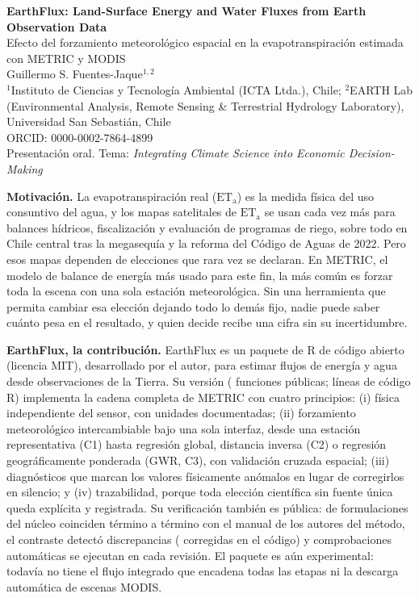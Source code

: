 \documentclass[10pt,a4paper]{article}
\newcommand{\ETa}{\mathrm{ET_a}}
\begin{document}
\begin{center}
{\Large\bfseries EarthFlux: Land-Surface Energy and Water Fluxes from Earth Observation Data}\\[3pt]
{\large Efecto del forzamiento meteorológico espacial en la evapotranspiración estimada con METRIC y MODIS}\\[6pt]
Guillermo S. Fuentes-Jaque$^{1,2}$\\
{\small $^{1}$Instituto de Ciencias y Tecnología Ambiental (ICTA Ltda.), Chile; $^{2}$EARTH Lab (Environmental Analysis, Remote Sensing \& Terrestrial Hydrology Laboratory), Universidad San Sebastián, Chile}\\[2pt]
{\small ORCID: 0000-0002-7864-4899}\\[4pt]
{\small Presentación oral. Tema: \textit{Integrating Climate Science into Economic Decision-Making}}
\end{center}

\textbf{Motivación.} La evapotranspiración real ($\ETa$) es la medida física del uso consuntivo del agua, y los mapas satelitales de $\ETa$ se usan cada vez más para balances hídricos, fiscalización y evaluación de programas de riego, sobre todo en Chile central tras la megasequía y la reforma del Código de Aguas de 2022. Pero esos mapas dependen de elecciones que rara vez se declaran. En METRIC, el modelo de balance de energía más usado para este fin, la más común es forzar toda la escena con una sola estación meteorológica. Sin una herramienta que permita cambiar esa elección dejando todo lo demás fijo, nadie puede saber cuánto pesa en el resultado, y quien decide recibe una cifra sin su incertidumbre.

\textbf{EarthFlux, la contribución.} EarthFlux es un paquete de R de código abierto (licencia MIT), desarrollado por el autor, para estimar flujos de energía y agua desde observaciones de la Tierra. Su versión \EarthFluxVersion{} (\NExports{} funciones públicas; \NLinesR{} líneas de código R) implementa la cadena completa de METRIC con cuatro principios: (i) física independiente del sensor, con unidades documentadas; (ii) forzamiento meteorológico intercambiable bajo una sola interfaz, desde una estación representativa (C1) hasta regresión global, distancia inversa (C2) o regresión geográficamente ponderada (GWR, C3), con validación cruzada espacial; (iii) diagnósticos que marcan los valores físicamente anómalos en lugar de corregirlos en silencio; y (iv) trazabilidad, porque toda elección científica sin fuente única queda explícita y registrada. Su verificación también es pública: \VerVerified{} de \VerRows{} formulaciones del núcleo coinciden término a término con el manual de los autores del método, el contraste detectó \VerDiscrepancies{} discrepancias (\VerFixed{} corregidas en el código) y \NExpectations{} comprobaciones automáticas se ejecutan en cada revisión. El paquete es aún experimental: todavía no tiene el flujo integrado que encadena todas las etapas ni la descarga automática de escenas MODIS.
\end{document}
